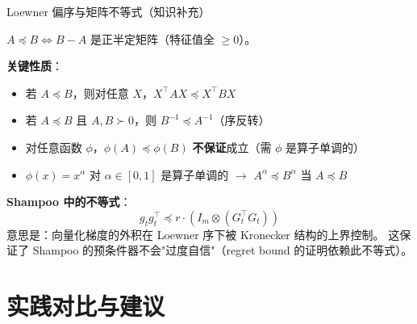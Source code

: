 \documentclass[aspectratio=169,10pt]{ctexbeamer}
\begin{document}
\begin{frame}{Loewner 偏序与矩阵不等式（知识补充）}
\begin{definition}[Loewner 偏序]
  $A \preceq B \iff B-A$ 是正半定矩阵（特征值全 $\ge0$）。
\end{definition}

\vspace{0.2cm}
\textbf{关键性质}：
\begin{itemize}
  \item 若 $A\preceq B$，则对任意 $X$，$X^\top A X \preceq X^\top B X$
  \item 若 $A\preceq B$ 且 $A,B\succ0$，则 $B^{-1}\preceq A^{-1}$（序反转）
  \item 对任意函数 $\phi$，$\phi(A)\preceq\phi(B)$ \textbf{不保证}成立（需 $\phi$ 是算子单调的）
  \item $\phi(x)=x^\alpha$ 对 $\alpha\in[0,1]$ 是算子单调的 $\to$ $A^\alpha\preceq B^\alpha$ 当 $A\preceq B$
\end{itemize}

\vspace{0.2cm}
\textbf{Shampoo 中的不等式}：
\[
  g_t g_t^\top \preceq r\cdot (I_m\otimes (G_t^\top G_t))
\]
意思是：向量化梯度的外积在 Loewner 序下被 Kronecker 结构的上界控制。
这保证了 Shampoo 的预条件器不会"过度自信"（regret bound 的证明依赖此不等式）。
\end{frame}

\section{实践对比与建议}
\end{document}
